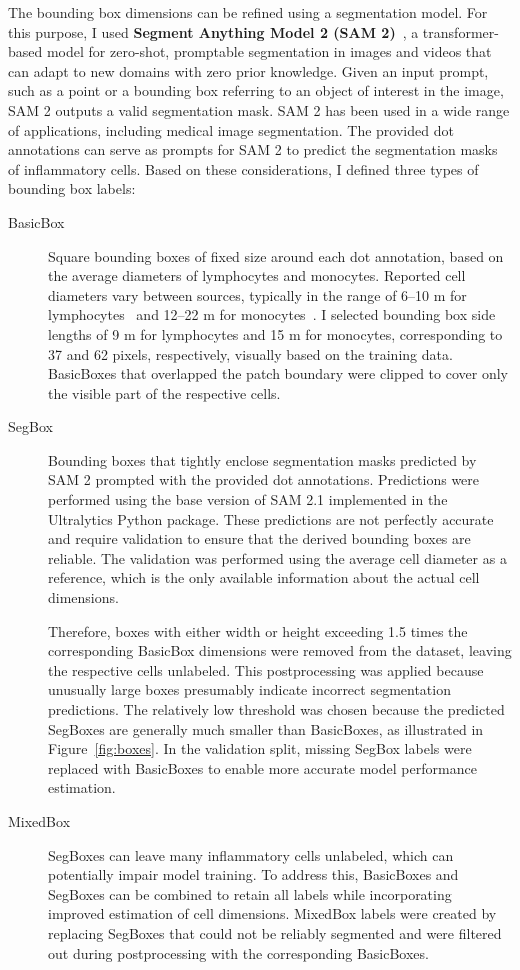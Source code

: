 The bounding box dimensions can be refined using a segmentation model. For this purpose, I used \textbf{Segment Anything Model 2 (SAM 2)}~\cite{Ravi2024}, a transformer-based model for zero-shot, promptable segmentation in images and videos that can adapt to new domains with zero prior knowledge. Given an input prompt, such as a point or a bounding box referring to an object of interest in the image, SAM 2 outputs a valid segmentation mask. SAM 2 has been used in a wide range of applications, including medical image segmentation. The provided dot annotations can serve as prompts for SAM 2 to predict the segmentation masks of inflammatory cells. Based on these considerations, I defined three types of bounding box labels:
\begin{description}
    \item[BasicBox] Square bounding boxes of fixed size around each dot annotation, based on the average diameters of lymphocytes and monocytes. Reported cell diameters vary between sources, typically in the range of 6--10 \textmu m for lymphocytes~\cite{Studer2024, Mathur2013} and 12--22 \textmu m for monocytes~\cite{Studer2024, Tigner2025, Espinoza2025}. I selected bounding box side lengths of 9 \textmu m for lymphocytes and 15 \textmu m for monocytes, corresponding to 37 and 62 pixels, respectively, visually based on the training data. BasicBoxes that overlapped the patch boundary were clipped to cover only the visible part of the respective cells.

    \item[SegBox] Bounding boxes that tightly enclose segmentation masks predicted by SAM 2 prompted with the provided dot annotations. Predictions were performed using the base version of SAM 2.1 implemented in the Ultralytics Python package. These predictions are not perfectly accurate and require validation to ensure that the derived bounding boxes are reliable. The validation was performed using the average cell diameter as a reference, which is the only available information about the actual cell dimensions.
    
    Therefore, boxes with either width or height exceeding 1.5 times the corresponding BasicBox dimensions were removed from the dataset, leaving the respective cells unlabeled. This postprocessing was applied because unusually large boxes presumably indicate incorrect segmentation predictions. The relatively low threshold was chosen because the predicted SegBoxes are generally much smaller than BasicBoxes, as illustrated in Figure~\ref{fig:boxes}. In the validation split, missing SegBox labels were replaced with BasicBoxes to enable more accurate model performance estimation.
    
    \item[MixedBox] SegBoxes can leave many inflammatory cells unlabeled, which can potentially impair model training. To address this, BasicBoxes and SegBoxes can be combined to retain all labels while incorporating improved estimation of cell dimensions. MixedBox labels were created by replacing SegBoxes that could not be reliably segmented and were filtered out during postprocessing with the corresponding BasicBoxes.
\end{description}

